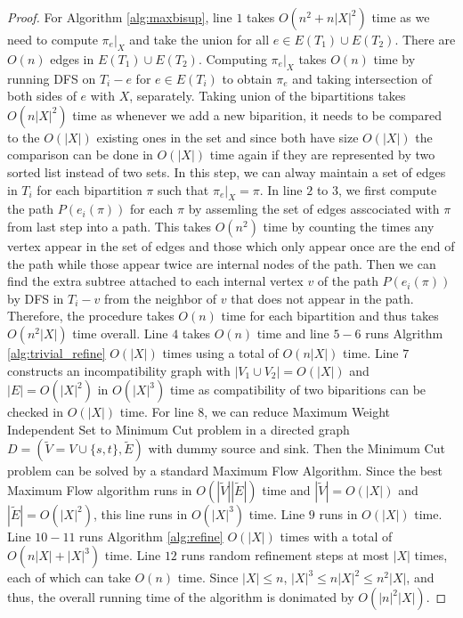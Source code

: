 \documentclass{bmcart}
\begin{document}
\begin{proof}
For Algorithm \ref{alg:maxbisup}, line $1$ takes $O(n^2+ n|X|^2)$ time as we need to compute $\pi_e|_X$ and take the union for all $e \in E(T_1) \cup E(T_2)$. There are $O(n)$ edges in $E(T_1) \cup E(T_2)$. Computing $\pi_e|_X$ takes $O(n)$ time by running DFS on $T_i - e$ for $e \in E(T_i)$ to obtain $\pi_e$ and taking intersection of both sides of $e$ with $X$, separately. Taking union of the bipartitions takes $O(n |X|^2)$ time as whenever we add a new biparition, it needs to be compared to the $O(|X|)$ existing ones in the set and since both have size $O(|X|)$ the comparison can be done in $O(|X|)$ time again if they are represented by two sorted list instead of two sets. In this step, we can alway maintain a set of edges in $T_i$ for each bipartition $\pi$ such that $\pi_e|_X = \pi$. In line $2$ to $3$, we first compute the path $P(e_i(\pi))$ for each $\pi$ by assemling the set of edges asscociated with $\pi$ from last step into a path. This takes $O(n^2)$ time by counting the times any vertex appear in the set of edges and those which only appear once are the end of the path while those appear twice are internal nodes of the path. Then we can find the extra subtree attached to each internal vertex $v$ of the path $P(e_i(\pi))$ by DFS in $T_i - v$ from the neighbor of $v$ that does not appear in the path. Therefore, the procedure takes $O(n)$ time for each bipartition and thus takes $O(n^2|X|)$ time overall. Line $4$ takes $O(n)$ time and line $5-6$ runs Algrithm \ref{alg:trivial_refine} $O(|X|)$ times using a total of $O(n|X|)$ time. Line $7$ constructs an incompatibility graph with $|V_1\cup V_2| = O(|X|)$ and $|E| = O(|X|^2)$ in $O(|X|^3)$ time as compatibility of two biparitions can be checked in $O(|X|)$ time. For line $8$, we can reduce Maximum Weight Independent Set to Minimum Cut problem in a directed graph $D = (\tilde{V} = V \cup \{s,t\}, \tilde{E})$ with dummy source and sink. Then the Minimum Cut problem can be solved by a standard Maximum Flow Algorithm. Since the best Maximum Flow algorithm runs in $O(|\tilde{V}||\tilde{E}|)$ time and $|\tilde{V}| = O(|X|)$ and $|\tilde{E}| = O(|X|^2)$, this line runs in $O(|X|^3)$ time. Line $9$ runs in $O(|X|)$ time. Line $10-11$ runs Algorithm \ref{alg:refine} $O(|X|)$ times with a total of $O(n|X|+|X|^3)$ time. Line $12$ runs random refinement steps at most $|X|$ times, each of which can take $O(n)$ time. Since $|X| \le n$, $|X|^3 \le n|X|^2 \le n^2|X|$, and thus, the overall running time of the algorithm is donimated by $O(|n|^2|X|)$.
\end{proof}
\end{document}
